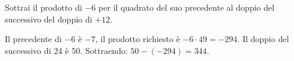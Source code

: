 
\begin{esercizio}
Sottrai il prodotto di $-6$ per il quadrato del suo precedente al doppio del successivo del doppio di $+12$.
\end{esercizio}

\begin{soluzione}
Il precedente di $-6$ è $-7$, il prodotto richiesto è $-6\cdot49=-294$.
Il doppio del successivo di 24 è 50. Sottraendo: $50-(-294)=344$.
\end{soluzione}
